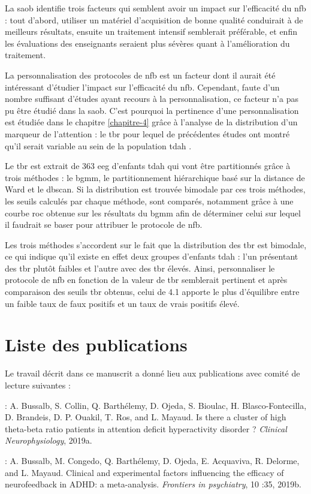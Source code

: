 La \gls{saob} identifie trois facteurs qui semblent avoir un impact sur l'efficacité du \gls{nfb} : tout d'abord, utiliser un matériel d'acquisition de bonne 
qualité conduirait à de meilleurs résultats, ensuite un traitement intensif semblerait préférable, et enfin les évaluations des enseignants seraient plus
sévères quant à l'amélioration du traitement. 

La personnalisation des protocoles de \gls{nfb} est un facteur dont il aurait été intéressant d'étudier l'impact sur l'efficacité du \gls{nfb}.  
Cependant, faute d'un nombre suffisant d'études ayant recours à la personnalisation, ce facteur n'a pas pu être étudié dans la \gls{saob}. C'est pourquoi
la pertinence d'une personnalisation est étudiée dans le chapitre \ref{chapitre-4} grâce à l'analyse de la distribution d'un marqueur de l'attention : le \gls{tbr} pour
lequel de précédentes études ont montré qu'il serait variable au sein de la population \gls{tdah} \citep{Zhang2017, Arns2013, Clarke2001}.

Le \gls{tbr} est extrait de 363 \gls{eeg} d'enfants \gls{tdah} qui vont être partitionnés grâce à trois méthodes : le \gls{bgmm}, le partitionnement
hiérarchique basé sur la distance de Ward et le \gls{dbscan}. Si la distribution est trouvée bimodale par ces trois méthodes, les seuils calculés par chaque méthode,
sont comparés, notamment grâce à une courbe \gls{roc} obtenue sur
les résultats du \gls{bgmm} afin de déterminer celui sur lequel il faudrait se baser pour attribuer le protocole de \gls{nfb}.

Les trois méthodes s'accordent sur le fait que la distribution des \gls{tbr} est bimodale, ce qui indique qu'il existe en effet deux groupes d'enfants
\gls{tdah} : l'un présentant des \gls{tbr} plutôt faibles et l'autre avec des \gls{tbr} élevés. Ainsi, personnaliser le protocole de \gls{nfb} en 
fonction de la valeur de \gls{tbr} semblerait pertinent et après comparaison des seuils \gls{tbr} obtenus, celui de 4.1 apporte le plus d'équilibre entre 
un faible taux de faux positifs et un taux de vrais positifs élevé.  

\section{Liste des publications}

Le travail décrit dans ce manuscrit a donné lieu aux publications avec comité de lecture suivantes :

\begin{description}
\item \citet{Bussalb2019tbr} : A. Bussalb, S. Collin, Q. Barthélemy, D. Ojeda, S. Bioulac, H. Blasco-Fontecilla,
D. Brandeis, D. P. Ouakil, T. Ros, and L. Mayaud. Is there a cluster of high
theta-beta ratio patients in attention deficit hyperactivity disorder ? \textit{Clinical Neurophysiology}, 2019a.
\item \citet{Bussalb2019clinical} : A. Bussalb, M. Congedo, Q. Barthélemy, D. Ojeda, E. Acquaviva, R. Delorme,
and L. Mayaud. Clinical and experimental factors influencing the efficacy of
neurofeedback in ADHD: a meta-analysis. \textit{Frontiers in psychiatry}, 10 :35, 2019b.
\end{description}

